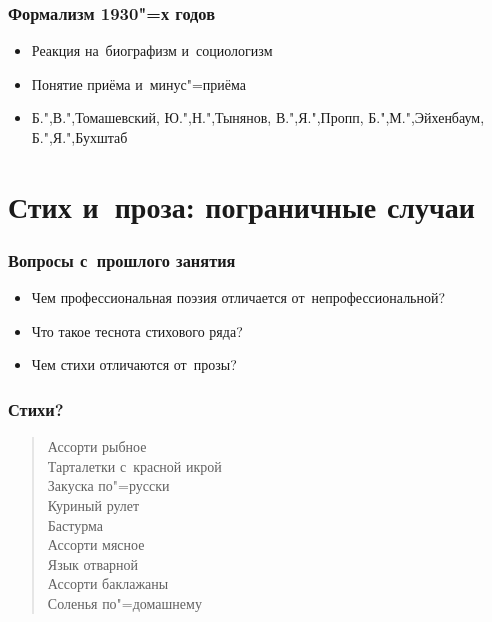 \documentclass{beamer}
\begin{document}
%
\begin{frame}
\frametitle{Формализм 1930"=х годов}

\begin{itemize}
\item Реакция на~биографизм и~социологизм
\item Понятие приёма и~минус"=приёма
\item Б.",В.",Томашевский, Ю.",Н.",Тынянов, В.",Я.",Пропп, Б.",М.",Эйхенбаум, Б.",Я.",Бухштаб
\end{itemize}

\end{frame}


\section{Стих и~проза: пограничные случаи}\label{sec:limit}


\begin{frame}
\frametitle{Вопросы с~прошлого занятия}

\begin{itemize}
\item Чем профессиональная поэзия отличается от~непрофессиональной?
\item Что такое теснота стихового ряда?
\item Чем стихи отличаются от~прозы?
\end{itemize}

\end{frame}


\begin{frame}
\frametitle{Стихи?}

\begin{verse}
Ассорти рыбное\\
Тарталетки с~красной икрой\\
Закуска по"=русски\\
Куриный рулет\\
Бастурма	\\
Ассорти мясное\\	
Язык отварной\\
Ассорти баклажаны\\
Соленья по"=домашнему
\end{verse}

\end{frame}
\end{document}

